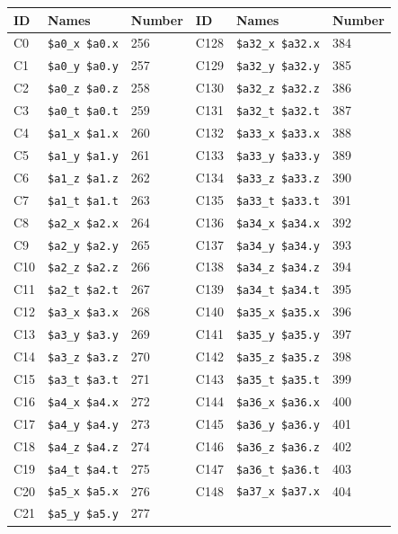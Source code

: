 \begin{table}
\begin{center}
{\small
\begin{tabular}{|l|l|l||l|l|l|} \hline
ID & Names & Number & ID & Names & Number \\ \hline
C0 & \verb|$a0_x $a0.x| & 256 &
C128 & \verb|$a32_x $a32.x| & 384 \\
C1 & \verb|$a0_y $a0.y| & 257 &
C129 & \verb|$a32_y $a32.y| & 385 \\
C2 & \verb|$a0_z $a0.z| & 258 &
C130 & \verb|$a32_z $a32.z| & 386 \\
C3 & \verb|$a0_t $a0.t| & 259 &
C131 & \verb|$a32_t $a32.t| & 387 \\
C4 & \verb|$a1_x $a1.x| & 260 &
C132 & \verb|$a33_x $a33.x| & 388 \\
C5 & \verb|$a1_y $a1.y| & 261 &
C133 & \verb|$a33_y $a33.y| & 389 \\
C6 & \verb|$a1_z $a1.z| & 262 &
C134 & \verb|$a33_z $a33.z| & 390 \\
C7 & \verb|$a1_t $a1.t| & 263 &
C135 & \verb|$a33_t $a33.t| & 391 \\
C8 & \verb|$a2_x $a2.x| & 264 &
C136 & \verb|$a34_x $a34.x| & 392 \\
C9 & \verb|$a2_y $a2.y| & 265 &
C137 & \verb|$a34_y $a34.y| & 393 \\
C10 & \verb|$a2_z $a2.z| & 266 &
C138 & \verb|$a34_z $a34.z| & 394 \\
C11 & \verb|$a2_t $a2.t| & 267 &
C139 & \verb|$a34_t $a34.t| & 395 \\
C12 & \verb|$a3_x $a3.x| & 268 &
C140 & \verb|$a35_x $a35.x| & 396 \\
C13 & \verb|$a3_y $a3.y| & 269 &
C141 & \verb|$a35_y $a35.y| & 397 \\
C14 & \verb|$a3_z $a3.z| & 270 &
C142 & \verb|$a35_z $a35.z| & 398 \\
C15 & \verb|$a3_t $a3.t| & 271 &
C143 & \verb|$a35_t $a35.t| & 399 \\
C16 & \verb|$a4_x $a4.x| & 272 &
C144 & \verb|$a36_x $a36.x| & 400 \\
C17 & \verb|$a4_y $a4.y| & 273 &
C145 & \verb|$a36_y $a36.y| & 401 \\
C18 & \verb|$a4_z $a4.z| & 274 &
C146 & \verb|$a36_z $a36.z| & 402 \\
C19 & \verb|$a4_t $a4.t| & 275 &
C147 & \verb|$a36_t $a36.t| & 403 \\
C20 & \verb|$a5_x $a5.x| & 276 &
C148 & \verb|$a37_x $a37.x| & 404 \\
C21 & \verb|$a5_y $a5.y| & 277 &

\end{tabular}}
\end{center}
\end{table}
